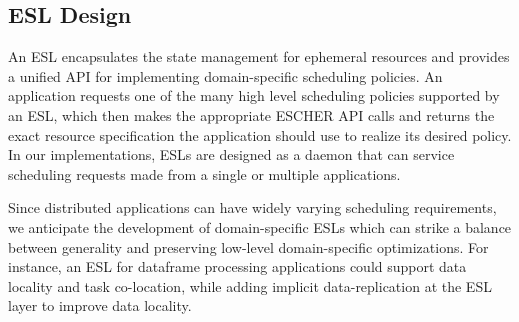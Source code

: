 
\subsection{ESL Design}
An ESL encapsulates the state management for ephemeral resources and provides a unified API for implementing domain-specific scheduling policies. An application requests one of the many high level scheduling policies supported by an ESL, which then makes the appropriate ESCHER API calls and returns the exact resource specification the application should use to realize its desired policy. In our implementations, ESLs are designed as a daemon that can service scheduling requests made from a single or multiple applications.


Since distributed applications can have widely varying scheduling requirements, we anticipate the development of domain-specific ESLs which can strike a balance between generality and preserving low-level domain-specific optimizations. For instance, an ESL for dataframe processing applications could support data locality and task co-location, while adding implicit data-replication at the ESL layer to improve data locality. 

